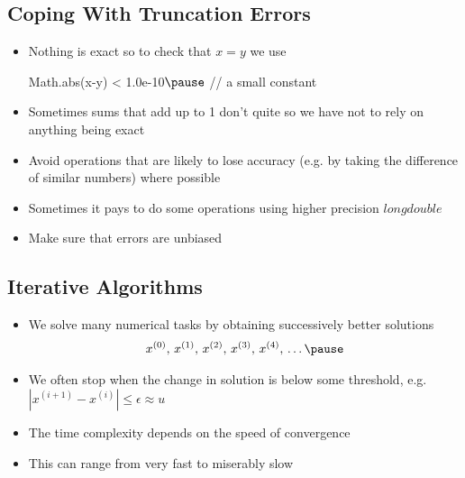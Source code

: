 
\begin{slide}
\section{Coping With Truncation Errors}

\begin{PauseHighLight}
  \begin{itemize}
  \item Nothing is exact so to check that $x = y$ we use
    \begin{java}
      Math.abs(x-y) < 1.0e-10$\pause$  // a small constant
    \end{java}
  \item Sometimes sums that add up to 1 don't quite so we have not to
    rely on anything being exact\pause
  \item Avoid operations that are likely to lose accuracy (e.g. by
    taking the difference of similar numbers) where possible\pause
  \item Sometimes it pays to do some operations using higher precision
    \jl$long double$\pause
  \item Make sure that errors are unbiased\pause
  \end{itemize}
\end{PauseHighLight}

\end{slide}

\Outline %

\begin{slide}
\section{Iterative Algorithms}

\begin{PauseHighLight}
  \begin{itemize}
  \item We solve many numerical tasks by obtaining successively
    better solutions
    \begin{align*}
      x^{(0)},\, x^{(1)},\, x^{(2)},\, x^{(3)},\, x^{(4)},\,\ldots\pause
    \end{align*}
  \item We often stop when the change in solution is below some
    threshold, e.g. $|x^{(i+1)}-x^{(i)}|\leq \epsilon \approx u$\pause
  \item The time complexity depends on the speed of convergence\pause
  \item This can range from very fast to miserably slow\pause
  \end{itemize}
\end{PauseHighLight}

\end{slide}

